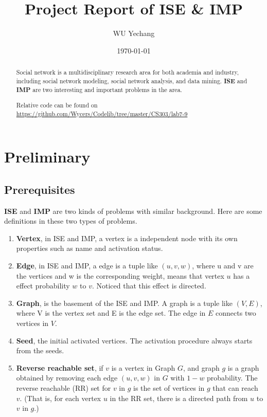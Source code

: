 \documentclass[lang=en,12pt]{elegantpaper}
\title{Project Report of ISE \& IMP}
\author{WU Yechang}
\institute{11711918}
\date{\today}
\begin{document}
\maketitle

\begin{abstract}

Social network is a multidisciplinary research area for both academia and industry, including social network modeling, social network analysis, and data mining.
\textbf{ISE} and \textbf{IMP} are two interesting and important problems in the area.

Relative code can be found on \href{https://github.com/Wycers/Codelib/tree/master/CS303/lab7-9}{https://github.com/Wycers/Codelib/tree/master/CS303/lab7-9}
\end{abstract}


\section{Preliminary}
\subsection{Prerequisites}
\textbf{ISE} and \textbf{IMP} are two kinds of problems with similar background. Here are some definitions in these two types of problems.

\begin{enumerate}
  \item \textbf{Vertex}, in ISE and IMP, a vertex is a independent node with its own properties such as name and activation status.
  \item \textbf{Edge}, in ISE and IMP, a edge is a tuple like $(u, v, w)$, where u and v are the vertices and w is the corresponding weight, means that vertex $u$ has a effect probability $w$ to $v$.
  Noticed that this effect is directed.
  \item \textbf{Graph}, is the basement of the ISE and IMP. A graph is a tuple like $(V, E)$, where V is the vertex set and E is the edge set. The edge in $E$ connects two vertices in $V$.
  \item \textbf{Seed}, the initial activated vertices. The activation procedure always starts from the seeds.
  \item \textbf{Reverse reachable set}, if $v$ is a vertex in Graph $G$,
   and graph $g$ is a graph obtained by removing each edge $(u, v, w)$ in $G$ with $1 - w$ probability.
   The reverse reachable (RR) set for $v$ in $g$ is the set of vertices in $g$ that can reach $v$.
   (That is, for each vertex $u$ in the RR set, there is a directed path from $u$ to $v$ in $g$.)\cite{7733128}
\end{enumerate}
\end{document}
